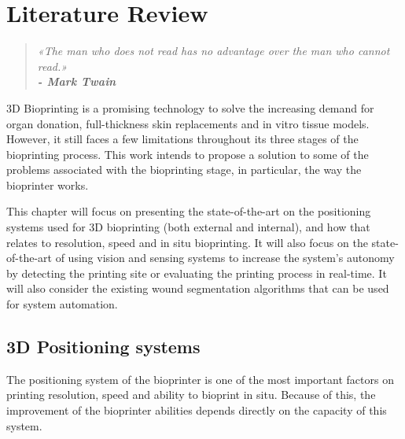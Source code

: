 
\chapter{Literature Review}
\label{cha:literature_review}

\begin{quotation}
\begin{flushright}
\itshape
«The man who does not read has no advantage over the man who cannot read.»\\
\textbf{- Mark Twain}
\end{flushright}
\end{quotation}

3D Bioprinting is a promising technology to solve the increasing demand for organ donation, full-thickness skin replacements and in vitro tissue models. However, it still faces a few limitations throughout its three stages of the bioprinting process. This work intends to propose a solution to some of the problems associated with the bioprinting stage, in particular, the way the bioprinter works.

This chapter will focus on presenting the state-of-the-art on the positioning systems used for 3D bioprinting (both external and internal), and how that relates to resolution, speed and in situ bioprinting. It will also focus on the state-of-the-art of using vision and sensing systems to increase the system's autonomy by detecting the printing site or evaluating the printing process in real-time. It will also consider the existing wound segmentation algorithms that can be used for system automation.


\section{3D Positioning systems}
\label{sec:3d_positioning_systems}

The positioning system of the bioprinter is one of the most important factors on printing resolution, speed and ability to bioprint in situ. Because of this, the improvement of the bioprinter abilities depends directly on the capacity of this system.

